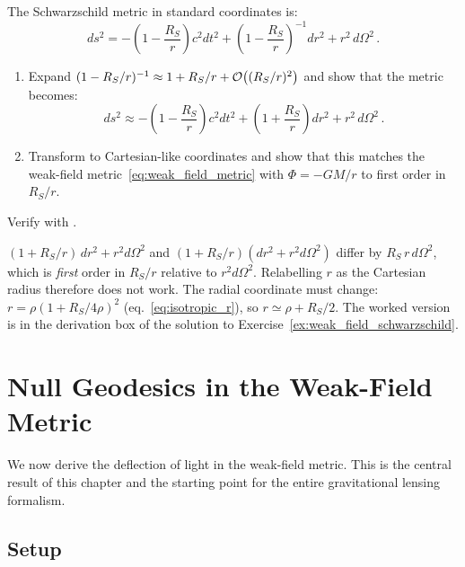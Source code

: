 \begin{exercise}
\label{ex:schwarzschild_weak_field}
The Schwarzschild metric in standard coordinates is:
\[
    ds^2 = -\left(1 - \frac{R_S}{r}\right) c^2 dt^2
    + \left(1 - \frac{R_S}{r}\right)^{-1} dr^2
    + r^2\, d\Omega^2 \,.
\]
\begin{enumerate}[label=(\alph*)]
    \item Expand $(1 - R_S/r)^{-1} \approx 1 + R_S/r + \mathcal{O}\!\left((R_S/r)^2\right)$
          and show that the metric becomes:
          \[
              ds^2 \approx -\left(1 - \frac{R_S}{r}\right) c^2 dt^2
              + \left(1 + \frac{R_S}{r}\right) dr^2
              + r^2\, d\Omega^2 \,.
          \]
    \item Transform to Cartesian-like coordinates and show that this
          matches the weak-field metric~\eqref{eq:weak_field_metric}
          with $\Phi = -GM/r$ to first order in $R_S/r$.
\end{enumerate}
Verify with
.
\end{exercise}

\begin{annotation}
$(1 + R_S/r)\,dr^2 + r^2d\Omega^2$ and $(1 + R_S/r)(dr^2 + r^2d\Omega^2)$
differ by $R_S\,r\,d\Omega^2$, which is \emph{first} order in $R_S/r$
relative to $r^2d\Omega^2$.  Relabelling $r$ as the Cartesian radius
therefore does not work.  The radial coordinate must change:
$r = \rho(1 + R_S/4\rho)^2$ (eq.~\eqref{eq:isotropic_r}), so
$r \simeq \rho + R_S/2$.  The worked version is in the derivation box of
the solution to Exercise~\ref{ex:weak_field_schwarzschild}.
\end{annotation}



\section{Null Geodesics in the Weak-Field Metric}
\label{sec:null_geodesics_weak}

We now derive the deflection of light in the weak-field metric.  This
is the central result of this chapter and the starting point for the
entire gravitational lensing formalism.

\subsection{Setup}

